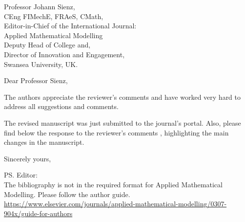 \documentclass[11pt]{letter} %
\begin{document}

\begin{letter}{Professor Johann Sienz, \\CEng FIMechE, FRAeS, CMath, \\Editor-in-Chief of the International Journal: \\Applied Mathematical Modelling \\Deputy Head of College and, \\Director of Innovation and Engagement, \\
Swansea University, UK.}






\opening{Dear Professor Sienz,} 
 
The authors appreciate the reviewer's comments and have worked very hard to address all suggestions and comments.

The revised manuscript was just submitted to the journal's portal. Also, please find below the response to the reviewer's comments , highlighting the main changes in the manuscript.

\closing{Sincerely yours,}


\ps{
Editor: \\
The bibliography is not in the required format for Applied Mathematical Modelling. Please follow the author guide.
\url{https://www.elsevier.com/journals/applied-mathematical-modelling/0307-904x/guide-for-authors}}


\end{letter}
\end{document}
